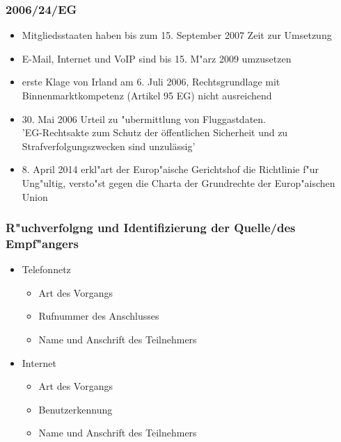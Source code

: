     \begin{frame}
      \frametitle{2006/24/EG}
      \begin{itemize}
        \item 
          Mitgliedsstaaten haben bis zum 15. September 2007 Zeit zur Umsetzung
        \item 
          E-Mail, Internet und VoIP sind bis 15. M"arz 2009 umzusetzen
        \item
          erste Klage von Irland am 6. Juli 2006, Rechtsgrundlage mit Binnenmarktkompetenz (Artikel 95 EG) nicht ausreichend
        \item
          30. Mai 2006 Urteil zu "ubermittlung von Fluggastdaten.\\
          'EG-Rechtsakte zum Schutz der öffentlichen Sicherheit und zu Strafverfolgungszwecken sind unzulässig'
        \item 
          8. April 2014 erkl"art der Europ"aische Gerichtshof die Richtlinie f"ur Ung"ultig, versto"st gegen die Charta der Grundrechte der Europ"aischen Union
      \end{itemize}
    \end{frame}

    \begin{frame}
      \frametitle{R"uchverfolgng und Identifizierung der Quelle/des Empf"angers}
      \begin{itemize}
        \item Telefonnetz
        \begin{itemize}
          \item Art des Vorgangs
          \item Rufnummer des Anschlusses
          \item Name und Anschrift des Teilnehmers
        \end{itemize}
        \item Internet
        \begin{itemize}
          \item Art des Vorgangs
          \item Benutzerkennung
          \item Name und Anschrift des Teilnehmers
        \end{itemize}
      \end{itemize}
    \end{frame}


